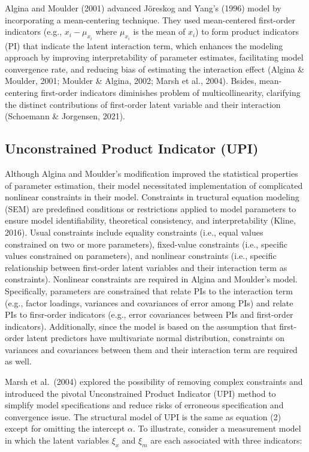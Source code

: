 \documentclass[
  man]{apa6}
\begin{document}
Algina and Moulder (2001) advanced Jöreskog and Yang's (1996) model by incorporating a mean-centering technique. They used mean-centered first-order indicators (e.g., \(x_{i} - \mu_{x_{i}}\) where \(\mu_{x_{i}}\) is the mean of \(x_{i}\)) to form product indicators (PI) that indicate the latent interaction term, which enhances the modeling approach by improving interpretability of parameter estimates, facilitating model convergence rate, and reducing bias of estimating the interaction effect (Algina \& Moulder, 2001; Moulder \& Algina, 2002; Marsh et al., 2004). Bsides, mean-centering first-order indicators diminishes problem of multicollinearity, clarifying the distinct contributions of first-order latent variable and their interaction (Schoemann \& Jorgensen, 2021).

\hypertarget{unconstrained-product-indicator-upi}{%
\subsection{Unconstrained Product Indicator (UPI)}\label{unconstrained-product-indicator-upi}}

Although Algina and Moulder's modification improved the statistical properties of parameter estimation, their model necessitated implementation of complicated nonlinear constraints in their model. Constraints in tructural equation modeling (SEM) are predefined conditions or restrictions applied to model parameters to ensure model identifiability, theoretical consistency, and interpretability (Kline, 2016). Usual constraints include equality constraints (i.e., equal values constrained on two or more parameters), fixed-value constraints (i.e., specific values constrained on parameters), and nonlinear constraints (i.e., specific relationship between first-order latent variables and their interaction term as constraints). Nonlinear constraints are required in Algina and Moulder's model. Specifically, parameters are constrained that relate PIs to the interaction term (e.g., factor loadings, variances and covariances of error among PIs) and relate PIs to firsr-order indicators (e.g., error covariances between PIs and first-order indicators). Additionally, since the model is based on the assumption that first-order latent predictors have multivariate normal distribution, constraints on variances and covariances between them and their interaction term are required as well.

Marsh et al.~(2004) explored the possibility of removing complex constraints and introduced the pivotal Unconstrained Product Indicator (UPI) method to simplify model specifications and reduce risks of erroneous specification and convergence issue. The structural model of UPI is the same as equation (2) except for omitting the intercept \(\alpha\). To illustrate, consider a measurement model in which the latent variables \(\xi_{x}\) and \(\xi_{m}\) are each associated with three indicators:
\end{document}
